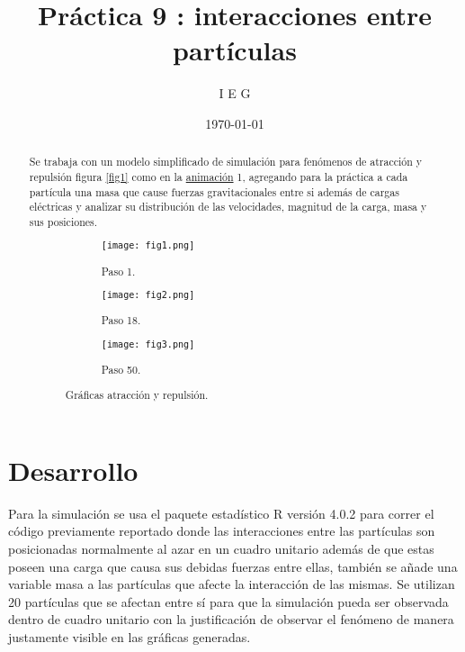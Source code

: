 \documentclass{article}
\author{I E G} %
\title{Práctica 9 : interacciones entre partículas} %
\date{\today}
\begin{document}

\maketitle %

\begin{abstract} %
Se trabaja con un modelo simplificado de simulación para fenómenos de atracción y repulsión figura \ref{fig1} como en la \href{https://github.com/IsaacEstrada159/simulacion/blob/master/P09/elisagif/p9p.gif}{animación} 1, agregando para la práctica a cada partícula una masa \cite{elis9} que cause fuerzas gravitacionales entre si además de cargas eléctricas y analizar su distribución de las velocidades, magnitud de la carga, masa y sus posiciones.

\begin{figure} [h!]
 	\centering
 	\begin{subfigure}[b]{0.40\linewidth}
 		\texttt{[image: fig1.png]}
 		 \caption{Paso 1.}
 		\label{3d}
 	\end{subfigure}
 	\begin{subfigure}[b]{0.40\linewidth}
 		\texttt{[image: fig2.png]}
 		 \caption{Paso 18.}
 		\label{levelplot}
 	\end{subfigure}
 	 	\begin{subfigure}[b]{0.40\linewidth}
 		\texttt{[image: fig3.png]}
 		 \caption{Paso 50.}
 		\label{levelplot}
 	\end{subfigure}
 	\caption{Gráficas atracción y repulsión.}  	
\label{fig1}
 \end{figure}




\end{abstract}


\section{Desarrollo}
Para la simulación se usa el paquete estadístico R versión 4.0.2 \cite{R} para correr el código previamente reportado \cite{elis9} donde las interacciones entre las partículas son posicionadas normalmente al azar en un cuadro unitario \cite{Fab3, cae2} además de que estas poseen una carga que causa sus debidas fuerzas entre ellas, también se añade una variable masa a las partículas que afecte la interacción de las mismas. Se utilizan 20 partículas que se afectan entre sí para que la simulación  pueda ser observada dentro de cuadro unitario con la justificación de observar el fenómeno de manera justamente visible en las gráficas generadas.
\end{document}
